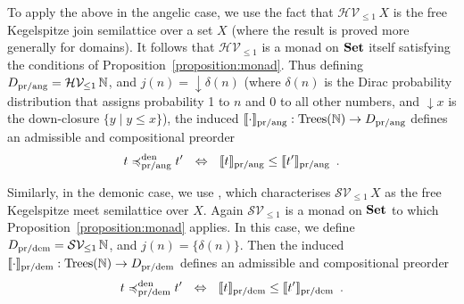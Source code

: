 To apply the above in the angelic case, we use the fact that $\mathcal{H}\mathcal{V}_{\leq 1} \,X$  is the free 
Kegelspitze join semilattice over a set $X$  \cite[Corollary 3.15]{KeimelP2016} (where the result is proved more generally for domains). It follows that $\mathcal{H}\mathcal{V}_{\leq 1} $ is
a monad on  $\mathbf{Set}$ itself  satisfying the conditions
of Proposition~\ref{proposition:monad}. Thus defining 
$D_{\text{pr/ang}} = \mathcal{H}\mathcal{V}_{\leq 1} \,\mathbb{N}$, and
$j(n) = \downarrow\!\delta(n)$ (where $\delta(n)$ is the Dirac probability distribution that assigns probability 1 to $n$ and $0$ to all other numbers, and $\downarrow\!x$ is the down-closure $\{y \mid y \leq x\}$), the induced $\llbracket \cdot \rrbracket_{\text{pr/ang}} : \textnormal{Trees}(\mathbb{N}) \to  D_{\text{pr/ang}}$ defines an admissible and compositional preorder
\[
t \preccurlyeq^{\text{den}}_{\text{pr/ang}} t' ~~ \Leftrightarrow ~~ \llbracket t \rrbracket_{\text{pr/ang}}  \leq \llbracket t' \rrbracket_{\text{pr/ang}} \enspace .
\]

Similarly, in the demonic case, we use \cite[Corollary 3.16]{KeimelP2016}, which characterises $\mathcal{S}\mathcal{V}_{\leq 1} \,X$ as the free Kegelspitze meet semilattice over $X$. Again $\mathcal{S}\mathcal{V}_{\leq 1}$ is a monad
on  $\mathbf{Set}$ to which Proposition~\ref{proposition:monad} applies. In this case, we define 
$D_{\text{pr/dem}} = \mathcal{S}\mathcal{V}_{\leq 1} \,\mathbb{N}$, and
$j(n) = \{\delta(n)\}$. Then the induced $\llbracket \cdot \rrbracket_{\text{pr/dem}} : \textnormal{Trees}(\mathbb{N}) \to  D_{\text{pr/dem}}$ defines an admissible and compositional preorder
\[
t \preccurlyeq^{\text{den}}_{\text{pr/dem}} t' ~~ \Leftrightarrow ~~ \llbracket t \rrbracket_{\text{pr/dem}}  \leq \llbracket t' \rrbracket_{\text{pr/dem}} \enspace .
\]



